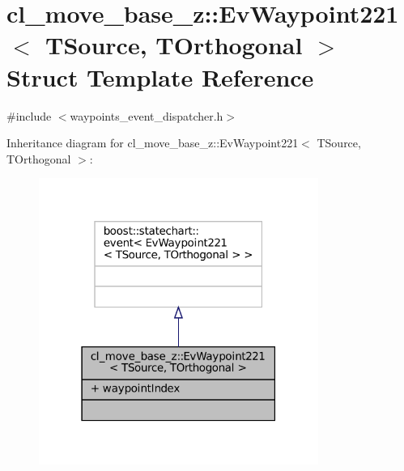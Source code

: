 \hypertarget{structcl__move__base__z_1_1EvWaypoint221}{}\section{cl\+\_\+move\+\_\+base\+\_\+z\+:\+:Ev\+Waypoint221$<$ T\+Source, T\+Orthogonal $>$ Struct Template Reference}
\label{structcl__move__base__z_1_1EvWaypoint221}


{\ttfamily \#include $<$waypoints\+\_\+event\+\_\+dispatcher.\+h$>$}



Inheritance diagram for cl\+\_\+move\+\_\+base\+\_\+z\+:\+:Ev\+Waypoint221$<$ T\+Source, T\+Orthogonal $>$\+:
\nopagebreak
\begin{figure}[H]
\begin{center}
\leavevmode
\includegraphics[width=259pt]{structcl__move__base__z_1_1EvWaypoint221__inherit__graph}
\end{center}
\end{figure}


